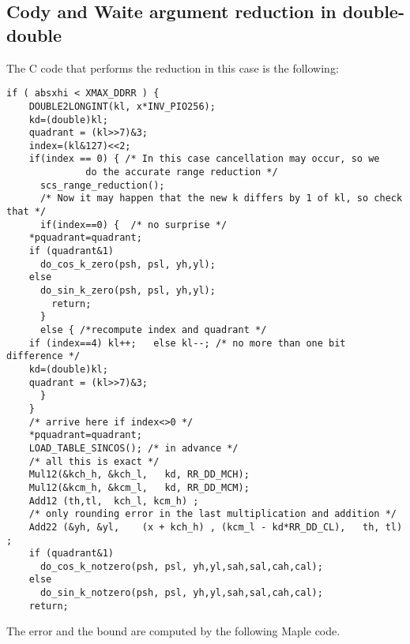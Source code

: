 \subsection{Cody and Waite argument reduction in double-double}
The C code that performs the reduction in this case is the following:

\begin{lstlisting}[caption={Cody and Waite argument reduction in
    double-double},firstnumber=1]
  if ( absxhi < XMAX_DDRR ) {
    DOUBLE2LONGINT(kl, x*INV_PIO256);
    kd=(double)kl;
    quadrant = (kl>>7)&3;
    index=(kl&127)<<2;
    if(index == 0) { /* In this case cancellation may occur, so we
			  do the accurate range reduction */
      scs_range_reduction(); 
      /* Now it may happen that the new k differs by 1 of kl, so check that */
      if(index==0) {  /* no surprise */
	*pquadrant=quadrant;
	if (quadrant&1)
	  do_cos_k_zero(psh, psl, yh,yl);
	else 
	  do_sin_k_zero(psh, psl, yh,yl);
      	return;
      }
      else { /*recompute index and quadrant */
	if (index==4) kl++;   else kl--; /* no more than one bit difference */
	kd=(double)kl;
	quadrant = (kl>>7)&3;
      }
    }
    /* arrive here if index<>0 */
    *pquadrant=quadrant;
    LOAD_TABLE_SINCOS(); /* in advance */
    /* all this is exact */
    Mul12(&kch_h, &kch_l,   kd, RR_DD_MCH);
    Mul12(&kcm_h, &kcm_l,   kd, RR_DD_MCM);
    Add12 (th,tl,  kch_l, kcm_h) ;
    /* only rounding error in the last multiplication and addition */ 
    Add22 (&yh, &yl,    (x + kch_h) , (kcm_l - kd*RR_DD_CL),   th, tl) ;
    if (quadrant&1)
      do_cos_k_notzero(psh, psl, yh,yl,sah,sal,cah,cal);
    else 
      do_sin_k_notzero(psh, psl, yh,yl,sah,sal,cah,cal);
    return;
\end{lstlisting}


The error and the bound are computed by the following Maple code.

